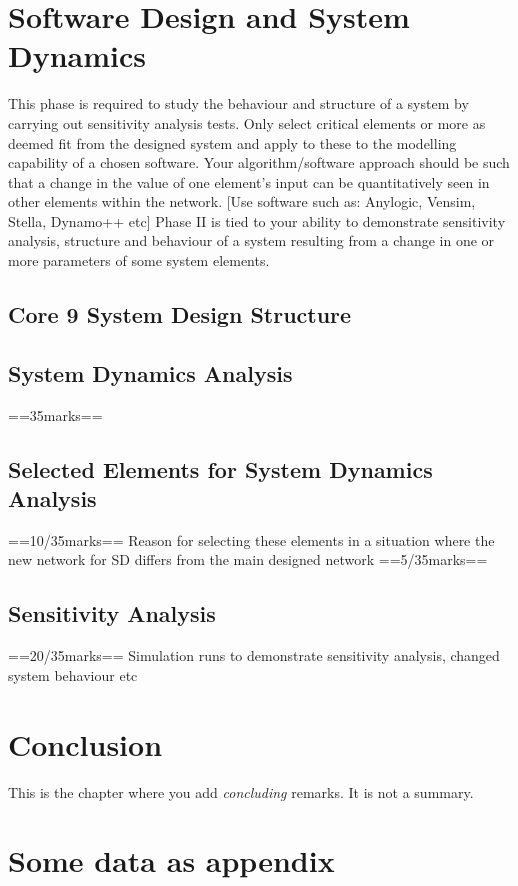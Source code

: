 \documentclass[a4paper,11pt,fleqn]{report}
\begin{document}
\chapter{Software Design and System Dynamics}
This phase is required to study the behaviour and structure of a system by carrying out sensitivity analysis tests. Only select critical elements or more as deemed fit from the designed system and apply to these to the modelling capability of a chosen software.
Your algorithm/software approach should be such that a change in the value of one element’s input can be quantitatively seen in other elements within the network. [Use software such as: Anylogic, Vensim, Stella, Dynamo++ etc]
Phase II is tied to your ability to demonstrate sensitivity analysis, structure and behaviour of a system resulting from a change in one or more parameters of some system elements.

\section{Core 9 System Design Structure}

\section{System Dynamics Analysis}
==35marks==

\section{Selected Elements for System Dynamics Analysis}
==10/35marks==
Reason for selecting these elements in a situation where the new network for SD differs from the main designed network ==5/35marks==

\section{Sensitivity Analysis}
==20/35marks==
Simulation runs to demonstrate sensitivity analysis, changed system behaviour etc 

\chapter{Conclusion}
\acresetall
This is the chapter where you add \emph{concluding} remarks. It is not a summary.



\appendix
\chapter{Some data as appendix}
\end{document}
